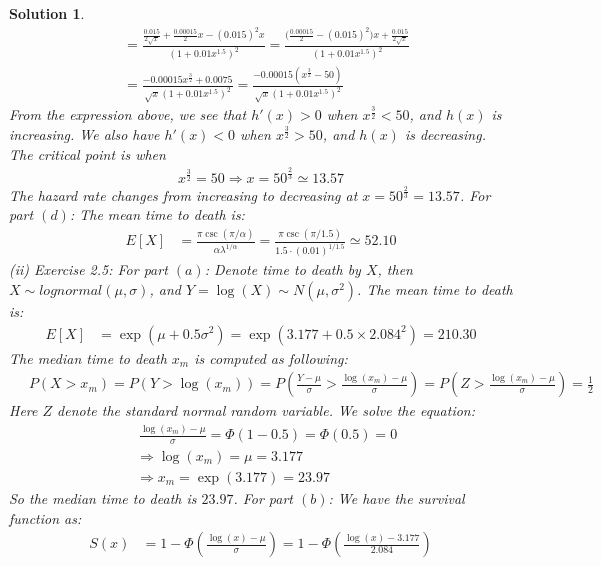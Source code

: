 \documentclass[11pt]{article}
\newtheorem{sol}{Solution}
\begin{document}
\begin{sol}
\begin{align*}
		&= \frac{\frac{0.015}{2\sqrt{x}} + \frac{0.00015}{2}x - (0.015)^2x}{(1 + 0.01 x^{1.5})^2} = \frac{\Big(\frac{0.00015}{2} - (0.015)^2\Big)x + \frac{0.015}{2\sqrt{x}}}{(1 + 0.01x^{1.5})^2}\\
		&= \frac{-0.00015 x^{\frac{3}{2}} + 0.0075}{\sqrt{x}(1 + 0.01 x^{1.5})^2} = \frac{-0.00015(x^{\frac{3}{2}} - 50)}{\sqrt{x}(1 + 0.01 x^{1.5})^2}
	\end{align*}
	From the expression above, we see that $h'(x) > 0$ when $x^{\frac{3}{2}} <50$, and $h(x)$ is increasing. We also have $h'(x) < 0$ when $x^{\frac{3}{2}} > 50$, and $h(x)$ is decreasing. The critical point is when 
	\begin{align*}
		x^{\frac{3}{2}} = 50 \Longrightarrow x = 50^{\frac{2}{3}} \simeq 13.57
	\end{align*}
	The hazard rate changes from increasing to decreasing at $x = 50^{\frac{2}{3}} = 13.57$.\vskip 2mm
	\hskip 2cm For part $(d)$:\vskip 2mm
	The mean time to death is:
	\begin{align*}
		E[X] &= \frac{\pi\csc(\pi/\alpha)}{\alpha \lambda^{1/\alpha}} = \frac{\pi\csc(\pi/1.5)}{1.5\cdot (0.01)^{1/1.5}} \simeq 52.10
	\end{align*}
	(ii) Exercise 2.5:\vskip 2mm
	\hskip 2cm For part $(a)$:\vskip 2mm
	Denote time to death by $X$, then $X \sim lognormal(\mu, \sigma)$, and $Y = \log(X) \sim N(\mu, \sigma^2)$.\vskip 2mm
	The mean time to death is:
	\begin{align*}
		E[X] &= \exp(\mu + 0.5\sigma^2) = \exp(3.177 + 0.5\times 2.084^2) =210.30
	\end{align*}
	The median time to death $x_m$ is computed as following:
	\begin{align*}
		&\ P(X > x_m) = P(Y > \log(x_m)) = P(\frac{Y - \mu}{\sigma} > \frac{\log(x_m) - \mu}{\sigma})= P(Z > \frac{\log(x_m) - \mu}{\sigma}) = \frac{1}{2}
	\end{align*}
	Here $Z$ denote the standard normal random variable.\vskip 2mm
	We solve the equation:
	\begin{align*}
		&\ \frac{\log(x_m) - \mu}{\sigma} = \Phi(1 - 0.5) = \Phi(0.5) = 0\\
		&\Longrightarrow \log(x_m) = \mu = 3.177\\
		&\Longrightarrow x_m = \exp(3.177) = 23.97
	\end{align*}
	So the median time to death is $23.97$.\vskip 2mm
	\hskip 2cm For part $(b)$:\vskip 2mm
	We have the survival function as:
	\begin{align*}
		S(x) &= 1 - \Phi(\frac{\log(x) - \mu}{\sigma}) = 1 - \Phi(\frac{\log(x) - 3.177}{2.084})

\end{align*}
\end{sol}
\end{document}
